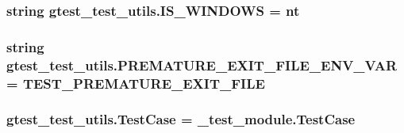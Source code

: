 \subsubsection[{\texorpdfstring{I\+S\+\_\+\+W\+I\+N\+D\+O\+WS}{IS_WINDOWS}}]{\setlength{\rightskip}{0pt plus 5cm}string gtest\+\_\+test\+\_\+utils.\+I\+S\+\_\+\+W\+I\+N\+D\+O\+WS = \textquotesingle{}nt\textquotesingle{}}\hypertarget{namespacegtest__test__utils_a7555b17006f1c078cda336750b8613e0}{}\label{namespacegtest__test__utils_a7555b17006f1c078cda336750b8613e0}
\subsubsection[{\texorpdfstring{P\+R\+E\+M\+A\+T\+U\+R\+E\+\_\+\+E\+X\+I\+T\+\_\+\+F\+I\+L\+E\+\_\+\+E\+N\+V\+\_\+\+V\+AR}{PREMATURE_EXIT_FILE_ENV_VAR}}]{\setlength{\rightskip}{0pt plus 5cm}string gtest\+\_\+test\+\_\+utils.\+P\+R\+E\+M\+A\+T\+U\+R\+E\+\_\+\+E\+X\+I\+T\+\_\+\+F\+I\+L\+E\+\_\+\+E\+N\+V\+\_\+\+V\+AR = \textquotesingle{}T\+E\+S\+T\+\_\+\+P\+R\+E\+M\+A\+T\+U\+R\+E\+\_\+\+E\+X\+I\+T\+\_\+\+F\+I\+LE\textquotesingle{}}\hypertarget{namespacegtest__test__utils_aa961c38a16224b2e7fd8c93fc1d2a90f}{}\label{namespacegtest__test__utils_aa961c38a16224b2e7fd8c93fc1d2a90f}
\subsubsection[{\texorpdfstring{Test\+Case}{TestCase}}]{\setlength{\rightskip}{0pt plus 5cm}gtest\+\_\+test\+\_\+utils.\+Test\+Case = \+\_\+test\+\_\+module.\+Test\+Case}\hypertarget{namespacegtest__test__utils_acb97a85206c09d233db6c7f2362e5428}{}\label{namespacegtest__test__utils_acb97a85206c09d233db6c7f2362e5428}
